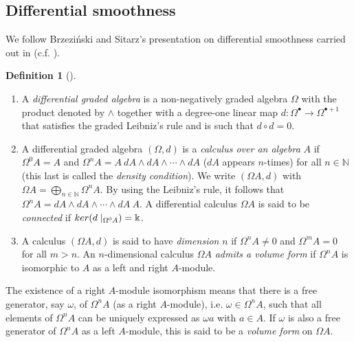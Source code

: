 \documentclass{amsart}
\theoremstyle{definition}
\newtheorem{definition}[theorem]{Definition}
\theoremstyle{remark}
\numberwithin{equation}{section}
\begin{document}
\subsection{Differential smoothness}\label{DefinitionsandpreliminariesDSA}

We follow Brzezi\'nski and Sitarz's presentation on differential smoothness carried out in \cite[Section 2]{BrzezinskiSitarz2017} (c.f. \cite{Brzezinski2008, Brzezinski2014}).

\begin{definition}[{\cite[Section 2.1]{BrzezinskiSitarz2017}}]
\begin{enumerate}
    \item [\rm (i)] A {\em differential graded algebra} is a non-negatively graded algebra $\Omega$ with the product denoted by $\wedge$ together with a degree-one linear map $d:\Omega^{\bullet} \to \Omega^{\bullet +1}$ that satisfies the graded Leibniz's rule and is such that $d \circ d = 0$. 
    
    \item [\rm (ii)] A differential graded algebra $(\Omega, d)$ is a {\em calculus over an algebra} $A$ if $\Omega^0 A = A$ and $\Omega^n A = A\ dA \wedge dA \wedge \dotsb \wedge dA$ ($dA$ appears $n$-times) for all $n\in \mathbb{N}$ (this last is called the {\em density condition}). We write $(\Omega A, d)$ with $\Omega A = \bigoplus_{n\in \mathbb{N}} \Omega^{n}A$. By using the Leibniz's rule, it follows that $\Omega^n A = dA \wedge dA \wedge \dotsb \wedge dA\ A$. A differential calculus $\Omega A$ is said to be {\em connected} if ${\rm ker}(d\mid_{\Omega^0 A}) = \Bbbk$.
    
    \item [\rm (iii)] A calculus $(\Omega A, d)$ is said to have {\em dimension} $n$ if $\Omega^n A\neq 0$ and $\Omega^m A = 0$ for all $m > n$. An $n$-dimensional calculus $\Omega A$ {\em admits a volume form} if $\Omega^n A$ is isomorphic to $A$ as a left and right $A$-module. 
\end{enumerate}
\end{definition}

The existence of a right $A$-module isomorphism means that there is a free generator, say $\omega$, of $\Omega^n A$ (as a right $A$-module), i.e. $\omega \in \Omega^n A$, such that all elements of $\Omega^n A$ can be uniquely expressed as $\omega a$ with $a \in A$. If $\omega$ is also a free generator of $\Omega^n A$ as a left $A$-module, this is said to be a {\em volume form} on $\Omega A$.
\end{document}

